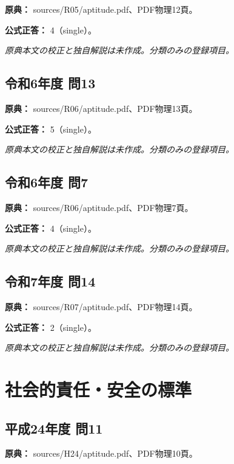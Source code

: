 \noindent\textbf{原典：} sources/R05/aptitude.pdf、PDF物理12頁。

\textbf{公式正答：} 4（single）。

\par\textit{原典本文の校正と独自解説は未作成。分類のみの登録項目。}

\subsection{令和6年度 問13}
\label{q:r06-reg-apt-13}

\noindent\textbf{原典：} sources/R06/aptitude.pdf、PDF物理13頁。

\textbf{公式正答：} 5（single）。

\par\textit{原典本文の校正と独自解説は未作成。分類のみの登録項目。}

\subsection{令和6年度 問7}
\label{q:r06-reg-apt-07}

\noindent\textbf{原典：} sources/R06/aptitude.pdf、PDF物理7頁。

\textbf{公式正答：} 4（single）。

\par\textit{原典本文の校正と独自解説は未作成。分類のみの登録項目。}

\subsection{令和7年度 問14}
\label{q:r07-reg-apt-14}

\noindent\textbf{原典：} sources/R07/aptitude.pdf、PDF物理14頁。

\textbf{公式正答：} 2（single）。

\par\textit{原典本文の校正と独自解説は未作成。分類のみの登録項目。}

\section{社会的責任・安全の標準}

\subsection{平成24年度 問11}
\label{q:h24-reg-apt-11}

\noindent\textbf{原典：} sources/H24/aptitude.pdf、PDF物理10頁。


